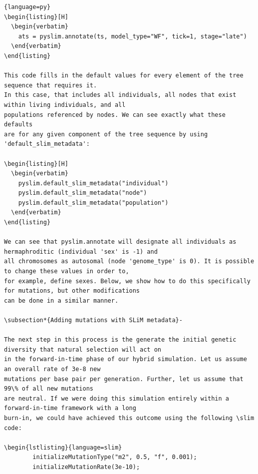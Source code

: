 \documentclass[12pt]{article}
\newcommand{\slim}[0]{\texttt{SLiM}\xspace}
\begin{document}
\begin{lstlisting}{language=py}
\begin{listing}[H]
  \begin{verbatim}
    ats = pyslim.annotate(ts, model_type="WF", tick=1, stage="late")
  \end{verbatim}
\end{listing}

This code fills in the default values for every element of the tree sequence that requires it. 
In this case, that includes all individuals, all nodes that exist within living individuals, and all
populations referenced by nodes. We can see exactly what these defaults
are for any given component of the tree sequence by using 'default_slim_metadata':

\begin{listing}[H]
  \begin{verbatim}
    pyslim.default_slim_metadata("individual")
    pyslim.default_slim_metadata("node")
    pyslim.default_slim_metadata("population")
  \end{verbatim}
\end{listing}

We can see that pyslim.annotate will designate all individuals as hermaphroditic (individual 'sex' is -1) and
all chromosomes as autosomal (node 'genome_type' is 0). It is possible to change these values in order to,
for example, define sexes. Below, we show how to do this specifically for mutations, but other modifications
can be done in a similar manner.

\subsection*{Adding mutations with SLiM metadata}-

The next step in this process is the generate the initial genetic diversity that natural selection will act on
in the forward-in-time phase of our hybrid simulation. Let us assume an overall rate of 3e-8 new
mutations per base pair per generation. Further, let us assume that 99\% of all new mutations
are neutral. If we were doing this simulation entirely within a forward-in-time framework with a long
burn-in, we could have achieved this outcome using the following \slim code:

\begin{lstlisting}{language=slim}
        initializeMutationType("m2", 0.5, "f", 0.001);
        initializeMutationRate(3e-10);
\end{lstlisting}
\end{document}
